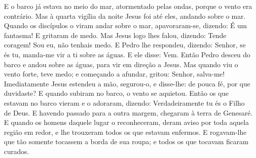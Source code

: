 {  E o barco já estava no meio do mar, atormentado pelas ondas, porque o vento era contrário.
  Mas à quarta vigília
 da noite Jesus foi até eles, andando sobre o mar.
  Quando os discípulos o viram andar sobre o mar, apavoraram-se, dizendo: É um fantasma! E gritaram de medo.
  Mas Jesus logo lhes falou, dizendo: Tende coragem! Sou eu, não tenhais medo.
  E Pedro lhe respondeu, dizendo: Senhor, se és tu, manda-me vir a ti sobre as águas.
  E ele disse: Vem. Então Pedro desceu do barco e andou sobre as águas, para vir em direção a Jesus.
  Mas quando viu o vento forte, teve medo; e começando a afundar, gritou: Senhor, salva-me!
  Imediatamente Jesus estendeu a mão, segurou-o, e disse-lhe:
{} de pouca fé, por que duvidaste?
  E quando subiram no barco, o vento se aquietou.
  Então os que estavam no barco vieram e o adoraram, dizendo: Verdadeiramente tu és o Filho de Deus.
  E havendo passado para a outra margem, chegaram à terra de Genesaré.
  E quando os homens daquele lugar o reconheceram, deram aviso por toda aquela região em redor, e lhe trouxeram todos os que estavam enfermos.
  E rogavam-lhe que tão somente tocassem a borda
 de sua roupa;
 e todos os que tocavam ficaram curados.
\par }

